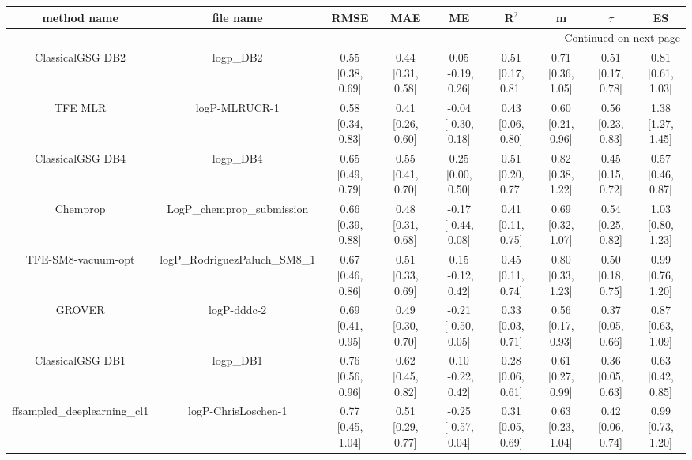 \documentclass{article}
\begin{document}
\begin{center}
\scriptsize
\begin{longtable}{|ccccccccc|}
\toprule
                  method name &                                      file name &               RMSE &                MAE &                    ME &              R$^2$ &                     m &                $\tau$ &                    ES \\
\midrule
\endhead
\midrule
\multicolumn{9}{r}{{Continued on next page}} \\
\midrule
\endfoot

\bottomrule
\endlastfoot
             ClassicalGSG DB2 &                                      logp\_DB2 &  0.55 [0.38, 0.69] &  0.44 [0.31, 0.58] &    0.05 [-0.19, 0.26] &  0.51 [0.17, 0.81] &     0.71 [0.36, 1.05] &     0.51 [0.17, 0.78] &     0.81 [0.61, 1.03] \\
                      TFE MLR &                                  logP-MLRUCR-1 &  0.58 [0.34, 0.83] &  0.41 [0.26, 0.60] &   -0.04 [-0.30, 0.18] &  0.43 [0.06, 0.80] &     0.60 [0.21, 0.96] &     0.56 [0.23, 0.83] &     1.38 [1.27, 1.45] \\
             ClassicalGSG DB4 &                                      logp\_DB4 &  0.65 [0.49, 0.79] &  0.55 [0.41, 0.70] &     0.25 [0.00, 0.50] &  0.51 [0.20, 0.77] &     0.82 [0.38, 1.22] &     0.45 [0.15, 0.72] &     0.57 [0.46, 0.87] \\
                     Chemprop &                     LogP\_chemprop\_submission &  0.66 [0.39, 0.88] &  0.48 [0.31, 0.68] &   -0.17 [-0.44, 0.08] &  0.41 [0.11, 0.75] &     0.69 [0.32, 1.07] &     0.54 [0.25, 0.82] &     1.03 [0.80, 1.23] \\
           TFE-SM8-vacuum-opt &                  logP\_RodriguezPaluch\_SM8\_1 &  0.67 [0.46, 0.86] &  0.51 [0.33, 0.69] &    0.15 [-0.12, 0.42] &  0.45 [0.11, 0.74] &     0.80 [0.33, 1.23] &     0.50 [0.18, 0.75] &     0.99 [0.76, 1.20] \\
                       GROVER &                                    logP-dddc-2 &  0.69 [0.41, 0.95] &  0.49 [0.30, 0.70] &   -0.21 [-0.50, 0.05] &  0.33 [0.03, 0.71] &     0.56 [0.17, 0.93] &     0.37 [0.05, 0.66] &     0.87 [0.63, 1.09] \\
             ClassicalGSG DB1 &                                      logp\_DB1 &  0.76 [0.56, 0.96] &  0.62 [0.45, 0.82] &    0.10 [-0.22, 0.42] &  0.28 [0.06, 0.61] &     0.61 [0.27, 0.99] &     0.36 [0.05, 0.63] &     0.63 [0.42, 0.85] \\
   ffsampled_deeplearning_cl1 &                            logP-ChrisLoschen-1 &  0.77 [0.45, 1.04] &  0.51 [0.29, 0.77] &   -0.25 [-0.57, 0.04] &  0.31 [0.05, 0.69] &     0.63 [0.23, 1.04] &     0.42 [0.06, 0.74] &     0.99 [0.73, 1.20] \\

\end{longtable}
\end{center}
\end{document}
